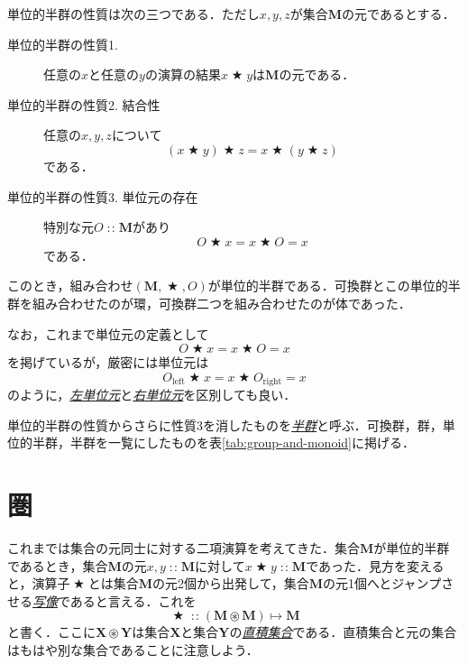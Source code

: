 \documentclass[a5paper,draft]{jsbook}
\newcommand{\keyword}[1]{{\underline{\emph{#1}}}}
\newcommand{\mathSub}[1]{\textrm{#1}}
\newcommand{\mathSet}[1]{\mathbf{#1}} %
\newcommand{\mathLeft}{\mathSub{left}}
\newcommand{\mathRight}{\mathSub{right}}
\newcommand{\mathBinaryOperator}[1]{\operatorname{#1}}
\newcommand{\mathAnyBinaryOperator}{\mathBinaryOperator{\bigstar}}
\newcommand{\mathIn}{\mathBinaryOperator{:\!:}}
\newcommand{\mathSetTimes}{\mathBinaryOperator{\circledast}}
\newcommand{\mathMapsTo}{\mapsto}
\newcommand{\mathMorph}[2]{#1\mathMapsTo#2}
\newcommand{\mathMonoid}[3]{(#1,#2,#3)}
\begin{document}
単位的半群の性質は次の三つである．ただし$x,y,z$が集合$\mathSet{M}$の元であるとする．
\begin{description}
\item[単位的半群の性質1.] 任意の$x$と任意の$y$の演算の結果$x\mathAnyBinaryOperator y$は$\mathSet{M}$の元である．
\item[単位的半群の性質2. 結合性] 任意の$x,y,z$について
\begin{equation}
(x\mathAnyBinaryOperator y)\mathAnyBinaryOperator z=x\mathAnyBinaryOperator(y\mathAnyBinaryOperator z)
\end{equation}
である．
\item[単位的半群の性質3. 単位元の存在] 特別な元$O\mathIn\mathSet{M}$があり
\begin{equation}
O\mathAnyBinaryOperator x=x\mathAnyBinaryOperator O=x
\end{equation}
である．
\end{description}
このとき，組み合わせ$\mathMonoid{\mathSet{M}}{\mathAnyBinaryOperator}{O}$が単位的半群である．可換群とこの単位的半群を組み合わせたのが環，可換群二つを組み合わせたのが体であった．

なお，これまで単位元の定義として
\begin{equation}
O\mathAnyBinaryOperator x=x\mathAnyBinaryOperator O=x
\end{equation}
を掲げているが，厳密には単位元は
\begin{equation}
O_\mathLeft\mathAnyBinaryOperator x=x\mathAnyBinaryOperator O_\mathRight=x
\end{equation}
のように，\keyword{左単位元}と\keyword{右単位元}を区別しても良い．

単位的半群の性質からさらに性質3を消したものを\keyword{半群}と呼ぶ．可換群，群，単位的半群，半群を一覧にしたものを表\ref{tab:group-and-monoid}に掲げる．

\section{圏}

これまでは集合の元同士に対する二項演算を考えてきた．集合$\mathSet{M}$が単位的半群であるとき，集合$\mathSet{M}$の元$x,y\mathIn\mathSet{M}$に対して$x\mathAnyBinaryOperator y\mathIn\mathSet{M}$であった．見方を変えると，演算子$\mathAnyBinaryOperator$とは集合$\mathSet{M}$の元2個から出発して，集合$\mathSet{M}$の元1個へとジャンプさせる\keyword{写像}であると言える．これを
\begin{equation}
\mathAnyBinaryOperator\mathIn{}\mathMorph{(\mathSet{M}\mathSetTimes\mathSet{M})}{\mathSet{M}}
\end{equation}
と書く．ここに$\mathSet{X}\mathSetTimes\mathSet{Y}$は集合$\mathSet{X}$と集合$\mathSet{Y}$の\keyword{直積集合}である．直積集合と元の集合はもはや別な集合であることに注意しよう．
\end{document}
